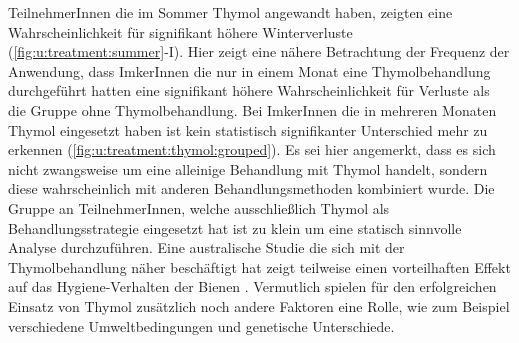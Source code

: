 TeilnehmerInnen die im Sommer Thymol angewandt haben, zeigten eine Wahrscheinlichkeit für signifikant höhere Winterverluste (\cref{fig:u:treatment:summer}-I). Hier zeigt eine nähere Betrachtung der Frequenz der Anwendung, dass ImkerInnen die nur in einem Monat eine Thymolbehandlung durchgeführt hatten eine signifikant höhere Wahrscheinlichkeit für Verluste als die Gruppe ohne Thymolbehandlung. Bei ImkerInnen die in mehreren Monaten Thymol eingesetzt haben ist kein statistisch signifikanter Unterschied mehr zu erkennen (\cref{fig:u:treatment:thymol:grouped}). Es sei hier angemerkt, dass es sich nicht zwangsweise um eine alleinige Behandlung mit Thymol handelt, sondern diese wahrscheinlich mit anderen Behandlungsmethoden kombiniert wurde. Die Gruppe an TeilnehmerInnen, welche ausschließlich Thymol als Behandlungsstrategie eingesetzt hat ist zu klein um eine statisch sinnvolle Analyse durchzuführen.
\newline
Eine australische Studie die sich mit der Thymolbehandlung näher beschäftigt hat zeigt teilweise einen vorteilhaften Effekt auf das Hygiene-Verhalten der Bienen \citep{colin2019}. Vermutlich spielen für den erfolgreichen Einsatz von Thymol zusätzlich noch andere Faktoren eine Rolle, wie zum Beispiel verschiedene Umweltbedingungen und genetische Unterschiede.


